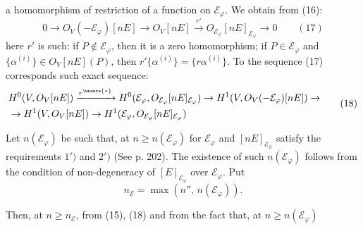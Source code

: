 
a homomorphism of restriction of a function on $\mathcal E_{\varphi}$. We obtain from (16):
\[
0\to O_V(-\mathcal E_{\varphi})[nE]\to O_V[nE]\xrightarrow{r'}O_{\mathcal E_{\varphi}}[nE]_{\mathcal E_{\varphi}}\to 0\qquad(17)
\]
here $r'$ is such: if $P\notin\mathcal E_{\varphi}$, then it is a zero homomorphism; if $P\in\mathcal E_{\varphi}$ and $\{\alpha^{(i)}\}\in O_V[nE](P)$, then $r'\{\alpha^{(i)}\}=\{r\alpha^{(i)}\}$. To the sequence (17) corresponds such exact sequence:
\[
\begin{aligned}
&H^0(V,O_V[nE])\xrightarrow{r^{\unsure{*}}} H^0(\mathcal E_{\varphi},O_{\mathcal E_{\varphi}}[nE]_{\mathcal E_{\varphi}})\to H^1(V,O_V(-\mathcal E_{\varphi})[nE])\to\\
&\to H^1(V,O_V[nE])\to H^1(\mathcal E_{\varphi},O_{\mathcal E_{\varphi}}[nE]_{\mathcal E_{\varphi}})
\end{aligned}
\qquad(18)
\]

Let $n(\mathcal E_{\varphi})$ be such that, at $n\geq n(\mathcal E_{\varphi})$ for $\mathcal E_{\varphi}$ and $[nE]_{\mathcal E_{\varphi}}$ satisfy the requirements $1')$ and $2')$ (See p. 202). The existence of such $n(\mathcal E_{\varphi})$ follows from the condition of non-degeneracy of $[E]_{\mathcal E_{\varphi}}$ over $\mathcal E_{\varphi}$. Put
\[
n_{\mathcal E}=\max(n'',\,n(\mathcal E_{\varphi})).
\]

Then, at $n\geq n_{\mathcal E}$, from (15), (18) and from the fact that, at $n\geq n(\mathcal E_{\varphi})$
